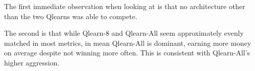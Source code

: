 The first immediate observation when looking at is that no architecture other than the two Qlearns was able to compete.

The second is that while Qlearn-8 and Qlearn-All seem approximately evenly matched in most metrics, in mean Qlearn-All is dominant, earning more money on average despite not winning more often. This is consistent with Qlearn-All's higher aggression.

\begin{figure}[H]
\centering
{}
\end{figure}
